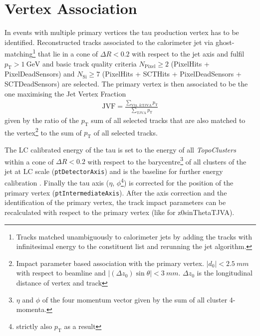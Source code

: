 \section{Vertex Association}
\label{sec:reco_vertex_assoc}
%
%
In events with multiple primary vertices the tau production vertex has to be
identified. Reconstructed tracks associated to the calorimeter jet via
ghost-matching\footnote{Tracks matched unambiguously to calorimeter jets by
  adding the tracks with infinitesimal energy to the constituent list and
  rerunning the jet algorithm.} that lie in a cone of $\Delta R < 0.2$ with
respect to the jet axis and fulfil $p_\mathrm{T} > \SI{1}{\giga\electronvolt}$
and basic track quality criteria $N_\mathrm{Pixel} \geq 2$ (PixelHits +
PixelDeadSensors) and $N_\mathrm{Si} \geq 7$ (PixelHits + SCTHits +
PixelDeadSensors + SCTDeadSensors) are selected. The primary vertex is
then associated to be the one maximising the Jet Vertex Fraction
\begin{align*}
  \mathrm{JVF} = \frac{\sum_\text{Vtx.\ \& TJVA} p_\mathrm{T}}
                                           {\sum_\text{TJVA} p_\mathrm{T}}
\end{align*}
given by the ratio of the $p_\mathrm{T}$ sum of all selected tracks that are
also matched to the vertex\footnote{Impact parameter based association with the
  primary vertex. $|d_0| < \SI{2.5}{mm}$ with respect to beamline and
  $|(\Delta z_0) \sin\theta| < \SI{3}{mm}$. $\Delta z_0$ is the longitudinal
  distance of vertex and track} to the sum of $p_\mathrm{T}$ of all selected
tracks.

The LC calibrated energy of the tau is set to the energy of all
\emph{TopoClusters} within a cone of $\Delta R < 0.2$ with respect to the
barycentre\footnote{$\eta$ and $\phi$ of the four momentum vector given by the
  sum of all cluster 4-momenta.} of all clusters of the jet at LC scale
(\texttt{ptDetectorAxis}) and is the baseline for further energy calibration
. Finally the tau axis ($\eta$,
$\phi$\footnote{strictly also $p_\mathrm{T}$ as a result}) is corrected for the
position of the primary vertex (\texttt{ptIntermediateAxis}). After the axis
correction and the identification of the primary vertex, the track impact
parameters can be recalculated with respect to the primary vertex (like for
z0sinThetaTJVA).

